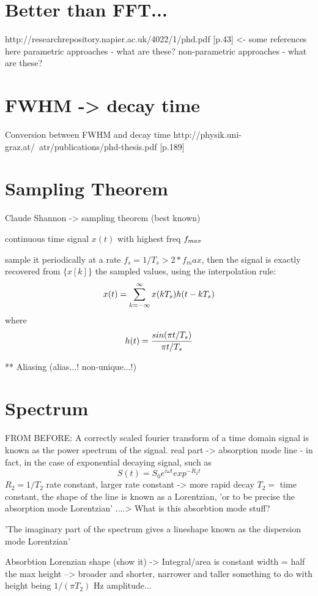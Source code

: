 \section{Better than FFT...}
http://researchrepository.napier.ac.uk/4022/1/phd.pdf [p.43] <- some references
here parametric approaches - what are these? non-parametric approaches - what
are these?

\section{FWHM -> decay time} Conversion between FWHM and decay time
http://physik.uni-graz.at/~atr/publications/phd-thesis.pdf [p.189]

\section{Sampling Theorem}

Claude Shannon -> sampling theorem (best known)

continuous time signal $x(t)$ with highest freq $f_{max}$

sample it periodically at a rate $f_s = 1/T_s > 2*f_max$, then the signal is
exactly recovered from $\{x[k]\}$ the sampled values, using the interpolation
rule:
$$
x(t) = \sum_{k=-\infty}^{\infty} x(k T_s) h(t - k T_s)
$$
where
$$
h(t) = \frac{sin(\pi t / T_s)}{\pi t / T_s}
$$

** Aliasing (alias...! non-unique...!)


\section{Spectrum} FROM BEFORE: A correctly scaled fourier transform of a time
domain signal is known as the power spectrum of the signal. real part ->
absorption mode line - in fact, in the case of exponential decaying signal, such
as
$$
  S(t) = S_0 e^{i \omega t}exp^{ -R_2 t }
$$
$R_2 = 1 / T_2$ rate constant, larger rate constant -> more rapid decay $T_2 = $
time constant, the shape of the line is known as a Lorentzian, 'or to be precise
the absorption mode Lorentzian' ....> What is this absorbtion mode stuff? %

'The imaginary part of the spectrum gives a lineshape known as the dispersion
mode Lorentzian'

Absorbtion Lorenzian shape (show it) -> Integral/area is constant width = half
the max height --> broader and shorter, narrower and taller something to do with
height being $1/(\pi T_2)$ Hz %
amplitude...

